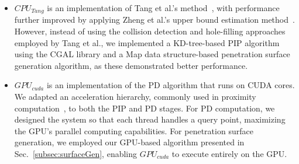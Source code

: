 \begin{itemize}
    \item $CPU_{Tang}$ is an implementation of Tang et al.'s method~\cite{SIG09HIST}, with performance further improved by applying Zheng et al.'s upper bound estimation method~\cite{zheng2022economic}.
    However, instead of using the collision detection and hole-filling approaches employed by Tang et al., we implemented a KD-tree-based PIP algorithm using the CGAL library and a Map data structure-based penetration surface generation algorithm, as these demonstrated better performance.
    
    \item $GPU_{cuda}$ is an implementation of the PD algorithm that runs on CUDA cores.
    We adapted an acceleration hierarchy, commonly used in proximity computation~\cite{lauterbach2010gproximity}, to both the PIP and PD stages.
    For PD computation, we designed the system so that each thread handles a query point, maximizing the GPU’s parallel computing capabilities.
    For penetration surface generation, we employed our GPU-based algorithm presented in Sec.~\ref{subsec:surfaceGen}, enabling $GPU_{cuda}$ to execute entirely on the GPU.

\end{itemize}

